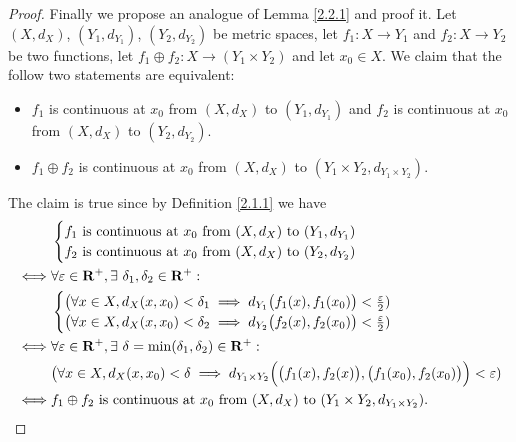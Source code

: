 \begin{proof}
    Finally we propose an analogue of Lemma \ref{2.2.1} and proof it.
    Let \((X, d_X)\), \((Y_1, d_{Y_1})\), \((Y_2, d_{Y_2})\) be metric spaces, let \(f_1 : X \to Y_1\) and \(f_2 : X \to Y_2\) be two functions, let \(f_1 \oplus f_2 : X \to (Y_1 \times Y_2)\) and let \(x_0 \in X\).
    We claim that the follow two statements are equivalent:
    \begin{itemize}
        \item \(f_1\) is continuous at \(x_0\) from \((X, d_X)\) to \((Y_1, d_{Y_1})\) and \(f_2\) is continuous at \(x_0\) from \((X, d_X)\) to \((Y_2, d_{Y_2})\).
        \item \(f_1 \oplus f_2\) is continuous at \(x_0\) from \((X, d_X)\) to \((Y_1 \times Y_2, d_{Y_1 \times Y_2})\).
    \end{itemize}
    The claim is true since by Definition \ref{2.1.1} we have
    \begin{align*}
             & \begin{cases}
                   f_1 \text{ is continuous at } x_0 \text{ from } (X, d_X) \text{ to } (Y_1, d_{Y_1}) \\
                   f_2 \text{ is continuous at } x_0 \text{ from } (X, d_X) \text{ to } (Y_2, d_{Y_2})
               \end{cases}                                                                   \\
        \iff & \forall \varepsilon \in \mathbf{R}^+, \exists\ \delta_1, \delta_2 \in \mathbf{R}^+ :                                                                                  \\
             & \begin{cases}
                   \big(\forall x \in X, d_X(x, x_0) < \delta_1 \implies d_{Y_1}\big(f_1(x), f_1(x_0)\big) < \frac{\varepsilon}{2}) \\
                   \big(\forall x \in X, d_X(x, x_0) < \delta_2 \implies d_{Y_2}\big(f_2(x), f_2(x_0)\big) < \frac{\varepsilon}{2})
               \end{cases}                                      \\
        \iff & \forall \varepsilon \in \mathbf{R}^+, \exists\ \delta = \min(\delta_1, \delta_2) \in \mathbf{R}^+ :                                                                   \\
             & \big(\forall x \in X, d_X(x, x_0) < \delta \implies d_{Y_1 \times Y_2}\Big(\big(f_1(x), f_2(x)\big), \big(f_1(x_0), f_2(x_0)\big)\Big) < \varepsilon) \\
        \iff & f_1 \oplus f_2 \text{ is continuous at } x_0 \text{ from } (X, d_X) \text{ to } (Y_1 \times Y_2, d_{Y_1 \times Y_2}).
    \end{align*}
\end{proof}

